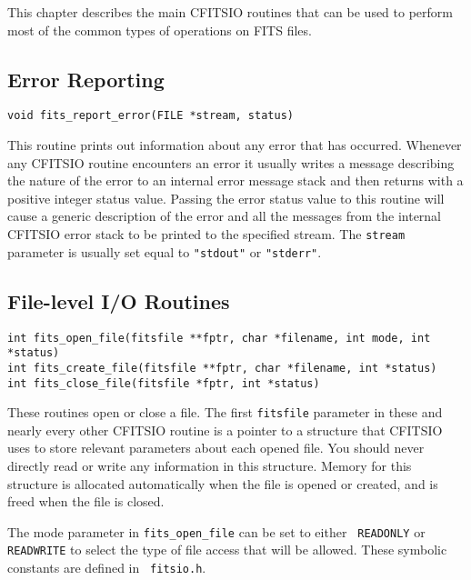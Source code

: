 \documentclass[11pt]{article}
\begin{document}
This chapter describes the main CFITSIO routines that can be used to
perform most of the common types of operations on FITS files.

\subsection{Error Reporting}

\begin{verbatim}
void fits_report_error(FILE *stream, status)
\end{verbatim}

This routine prints out information about any error that
has occurred.  Whenever any CFITSIO routine encounters an error it
usually writes a message describing the nature of the error to an
internal error message stack and then returns with a positive integer
status value. Passing the error status value to this routine will
cause  a generic description of the error and all the messages
from the internal CFITSIO error stack to be printed to the specified
stream.  The {\tt stream} parameter is usually set equal to
{\tt "stdout"} or {\tt "stderr"}.

\subsection{File-level I/O Routines}

\begin{verbatim}
int fits_open_file(fitsfile **fptr, char *filename, int mode, int *status)
int fits_create_file(fitsfile **fptr, char *filename, int *status)
int fits_close_file(fitsfile *fptr, int *status)
\end{verbatim}

These routines open or close a file.  The first {\tt fitsfile}
parameter  in these and nearly every other CFITSIO routine is a pointer
to a structure that CFITSIO uses to store relevant parameters about
each opened file.  You should never directly read or write any
information in this structure.  Memory for this structure is allocated
automatically when the file is opened or created,
and is freed when the file is closed.

The mode parameter in {\tt fits\_open\_file} can be set to either {\tt
READONLY} or {\tt READWRITE} to select the type of file access that
will be allowed. These symbolic constants are defined in {\tt
fitsio.h}.
\end{document}
